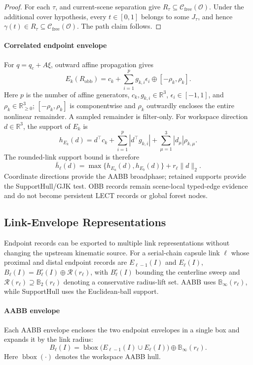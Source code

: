\documentclass[journal]{IEEEtran}
\newcommand{\Real}{\ensuremath{\mathbb{R}}}
\newcommand{\Ball}{\ensuremath{\mathbb{B}}}
\newcommand{\Cfree}{\ensuremath{\mathcal{C}_{\mathrm{free}}}}
\newcommand{\calO}{\ensuremath{\mathcal{O}}}
\begin{document}
\begin{proof}
For each $\tau$,  and current-scene
separation give $R_\tau\subseteq\Cfree(\calO)$. Under the additional cover
hypothesis, every $t\in[0,1]$ belongs to some $J_\tau$, and hence
$\gamma(t)\in R_\tau\subseteq\Cfree(\calO)$. The path claim follows.
\end{proof}

\paragraph{Correlated endpoint envelope}
For \(q=q_c+A\xi\), outward affine propagation gives
\[
E_k(R_{\mathrm{obb}})
=
c_k+\sum_{i=1}^{p} g_{k,i}\epsilon_i \oplus [-\rho_k,\rho_k].
\]
Here $p$ is the number of affine generators,
$c_k,g_{k,i}\in\Real^3$, $\epsilon_i\in[-1,1]$, and
$\rho_k\in\Real_{\ge0}^3$; $[-\rho_k,\rho_k]$ is componentwise and
\(\rho_k\) outwardly encloses the entire nonlinear remainder. A sampled
remainder is filter-only. For workspace direction \(d\in\mathbb{R}^3\), the
support of $E_k$ is
\[
h_{E_k}(d)=d^\top c_k+\sum_{i=1}^{p} |d^\top g_{k,i}|
          +\sum_{\mu=1}^3 |d_\mu|\rho_{k,\mu}.
\]
The rounded-link support bound is therefore
\[
\bar h_\ell(d)=
\max\{h_{E_a}(d),h_{E_b}(d)\}+r_\ell\|d\|_2.
\]
Coordinate directions provide the AABB broadphase; retained supports provide
the SupportHull/GJK test. OBB records remain scene-local typed-edge evidence
and do not become persistent LECT records or global forest nodes.

\subsection{Link-Envelope Representations}\label{sec:rewrite_link_env}

Endpoint records can be exported to multiple link representations without
changing the upstream kinematic source. For a serial-chain capsule link \(\ell\)
whose proximal and distal endpoint records are \(E_{\ell-1}(I)\) and
\(E_\ell(I)\),
$B_\ell(I)=B_\ell^\circ(I)\oplus\mathcal{R}(r_\ell)$, with
$B_\ell^\circ(I)$ bounding the centerline sweep and
\(\mathcal{R}(r_\ell)\supseteq\Ball_2(r_\ell)\) denoting a conservative
radius-lift set. AABB uses \(\Ball_\infty(r_\ell)\), while SupportHull uses the
Euclidean-ball support.

\paragraph{AABB envelope}
Each AABB envelope encloses the two endpoint envelopes in a single box and
expands it by the link radius:
\[
B_\ell(I) = \operatorname{bbox}\bigl(E_{\ell-1}(I) \cup E_\ell(I)\bigr)
\oplus \Ball_\infty(r_\ell).
\]
Here \(\operatorname{bbox}(\cdot)\) denotes the workspace AABB hull.
\end{document}
